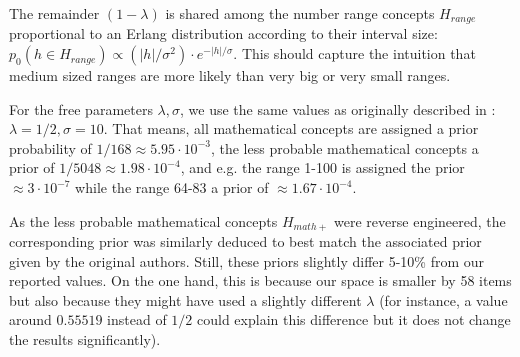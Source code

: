 The remainder $(1 - \lambda)$ is shared among the number range concepts $H_{range}$ proportional to an Erlang distribution according to their interval size: $p_0(h \in H_{range}) \propto (|h|/\sigma^2) \cdot e^{-|h|/\sigma}$. This should capture the intuition that medium sized ranges are more likely than very big or very small ranges.

For the free parameters $\lambda, \sigma$, we use the same values as originally described in \cite{tenenbaum2000rules}: $\lambda = 1/2, \sigma = 10$. 
That means, all mathematical concepts are assigned a prior probability of $1/168 \approx 5.95 \cdot 10^{-3}$, the less probable mathematical concepts a prior of $1/5048 \approx 1.98 \cdot 10^{-4}$, and e.g. the range 1-100 is assigned the prior $\approx 3 \cdot 10^{-7}$ while the range 64-83 a prior of $\approx 1.67 \cdot 10^{-4}$. 

As the less probable mathematical concepts $H_{math+}$ were reverse engineered, the corresponding prior was similarly deduced to best match the associated prior given by the original authors.
Still, these priors slightly differ 5-10\% from our reported values. On the one hand, this is because our space is smaller by 58 items but also because they might have used a slightly different $\lambda$ (for instance, a value around $0.55519$ instead of $1/2$ could explain this difference but it does not change the results significantly).

